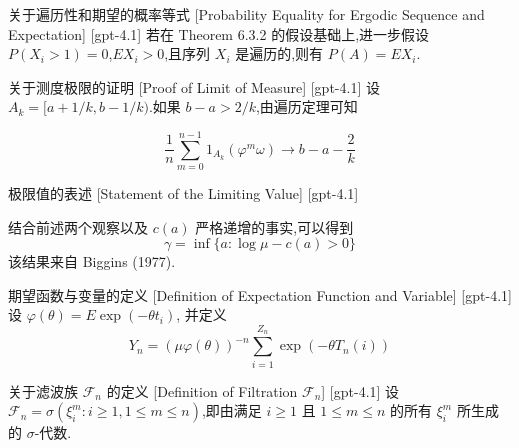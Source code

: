 \documentclass[UTF8]{ctexart}
\begin{document}
    
    
    \begin{thm}
        {关于遍历性和期望的概率等式}
        [Probability Equality for Ergodic Sequence and Expectation]
        [gpt-4.1]
        若在 Theorem 6.3.2 的假设基础上,进一步假设 $P(X_{i} > 1) = 0$,$E X_{i} > 0$,且序列 $X_{i}$ 是遍历的,则有 $P(A) = E X_{i}$.
    \end{thm}
    
    
    
    \begin{prf}
        {关于测度极限的证明}
        [Proof of Limit of Measure]
        [gpt-4.1]
        设 $A _ { k } = [ a + 1 / k , b - 1 / k )$.如果 $b - a > 2 / k$,由遍历定理可知

\[
\frac { 1 } { n } \sum _ { m = 0 } ^ { n - 1 } 1 _ { A _ { k } } ( \varphi ^ { m } \omega ) \to b - a - \frac { 2 } { k }
\]

    \end{prf}
    
    
    
    \begin{thm}
        {极限值的表述}
        [Statement of the Limiting Value]
        [gpt-4.1]
        
结合前述两个观察以及 $c(a)$ 严格递增的事实,可以得到
\[
\gamma = \operatorname*{inf} \{ a : \log \mu - c(a) > 0 \}
\]
该结果来自 Biggins (1977).

    \end{thm}
    
    
    
    \begin{dfn}
        {期望函数与变量的定义}
        [Definition of Expectation Function and Variable]
        [gpt-4.1]
        设 $\varphi(\theta) = E \exp(-\theta t_{i})$, 并定义
\[
Y_{n} = (\mu \varphi(\theta))^{-n} \sum_{i = 1}^{Z_{n}} \exp(-\theta T_{n}(i))
\]

    \end{dfn}
    
    
    
    \begin{dfn}
        {关于滤波族 $\mathcal{F}_n$ 的定义}
        [Definition of Filtration $\mathcal{F}_n$]
        [gpt-4.1]
        设 $\mathcal{F}_n = \sigma(\xi_i^m : i \ge 1, 1 \le m \le n)$,即由满足 $i \ge 1$ 且 $1 \le m \le n$ 的所有 $\xi_i^m$ 所生成的 $\sigma$-代数.
    \end{dfn}
    
\end{document}
